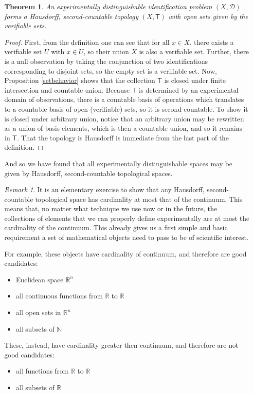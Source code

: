 \documentclass[review]{elsarticle}
\theoremstyle{plain}%
\newtheorem{thm}{Theorem}[section]
\theoremstyle{definition}
\theoremstyle{remark}
\newtheorem*{rem}{Remark}
\begin{document}
\begin{thm}
An experimentally distinguishable identification problem $(X,\mathcal{D})$ forms a Hausdorff, second-countable topology $(X,\mathsf{T})$ with open sets given by the verifiable sets. 
\end{thm}
\begin{proof}
First, from the definition one can see that for all $x\in X$, there exists a verifiable set $U$ with $x\in U$, so their union $X$ is also a verifiable set. Further, there is a null observation by taking the conjunction of two identifications corresponding to disjoint sets, so the empty set is a verifiable set. Now, Proposition \ref{setbehavior} shows that the collection $\mathsf{T}$ is closed under finite intersection and countable union. Because $\mathsf{T}$ is determined by an experimental domain of observations, there is a countable basis of operations which translates to a countable basis of open (verifiable) sets, so it is second-countable. To show it is closed under arbitrary union, notice that an arbitrary union may be rewritten as a union of basis elements, which is then a countable union, and so it remains in $\mathsf{T}$. That the topology is Hausdorff is immediate from the last part of the definition. 
\end{proof}


And so we have found that all experimentally distinguishable spaces may be given by Hausdorff, second-countable topological spaces. 


\begin{rem}
It is an elementary exercise to show that any Hausdorff, second-countable topological space has cardinality at most that of the continuum. This means that, no matter what technique we use now or in the future, the collections of elements that we can properly define experimentally are at most the cardinality of the continuum. This already gives us a first simple and basic requirement a set of mathematical objects need to pass to be of scientific interest.

For example, these objects have cardinality of continuum, and therefore are good candidates:
\begin{itemize}
	\item Euclidean space $\mathbb{R}^n$
	\item all continuous functions from $\mathbb{R}$ to $\mathbb{R}$
	\item all open sets in $\mathbb{R}^n$
	\item all subsets of $\mathbb{N}$
\end{itemize}

These, instead, have cardinality greater then continuum, and therefore are not good candidates:
\begin{itemize}
	\item all functions from $\mathbb{R}$ to $\mathbb{R}$
	\item all subsets of $\mathbb{R}$
\end{itemize}
\end{rem}
\end{document}
